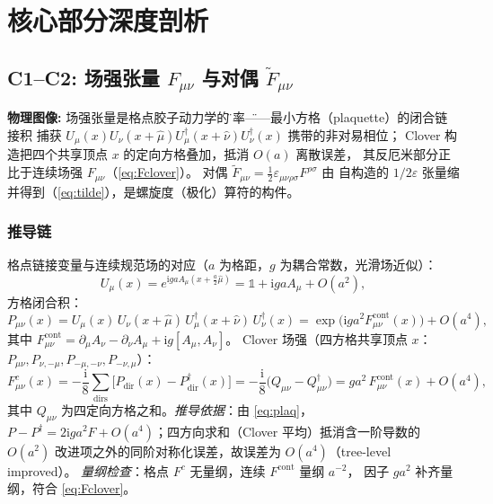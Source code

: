 \documentclass[UTF8]{ctexart}
\begin{document}
\section{核心部分深度剖析}

\subsection{C1--C2: 场强张量 $F_{\mu\nu}$ 与对偶 $\widetilde F_{\mu\nu}$}
\begin{physbox}
\textbf{物理图像:} 场强张量是格点胶子动力学的\"曲率\"——最小方格（plaquette）的闭合链接积
捕获 $U_\mu(x)U_\nu(x+\hat\mu)U^\dagger_\mu(x+\hat\nu)U^\dagger_\nu(x)$ 携带的非对易相位；
Clover 构造把四个共享顶点 $x$ 的定向方格叠加，抵消 $O(a)$ 离散误差，
其反厄米部分正比于连续场强 $F_{\mu\nu}$（\eqref{eq:Fclover}）。
对偶 $\widetilde F_{\mu\nu}=\tfrac12\varepsilon_{\mu\nu\rho\sigma}F^{\rho\sigma}$ 由
自构造的 $1/2\varepsilon$ 张量缩并得到（\eqref{eq:tilde}），是螺旋度（极化）算符的构件。
\end{physbox}

\subsubsection{推导链}
格点链接变量与连续规范场的对应（$a$ 为格距，$g$ 为耦合常数，光滑场近似）：
\begin{equation}\label{eq:link}
U_\mu(x)=e^{\mathrm i g a A_\mu(x+\tfrac a2\hat\mu)} = \mathbb 1 + \mathrm i g a A_\mu + O(a^2),
\end{equation}
方格闭合积：
\begin{equation}\label{eq:plaq}
P_{\mu\nu}(x)=U_\mu(x)\,U_\nu(x+\hat\mu)\,U^\dagger_\mu(x+\hat\nu)\,U^\dagger_\nu(x)
= \exp\!\big(\mathrm i g a^2 F^{\mathrm{cont}}_{\mu\nu}(x)\big)+O(a^4),
\end{equation}
其中 $F^{\mathrm{cont}}_{\mu\nu}=\partial_\mu A_\nu-\partial_\nu A_\mu+\mathrm i g[A_\mu,A_\nu]$。
Clover 场强（四方格共享顶点 $x$：$P_{\mu\nu},P_{\nu,-\mu},P_{-\mu,-\nu},P_{-\nu,\mu}$）：
\begin{equation}\label{eq:Fclover}
F^{c}_{\mu\nu}(x)
=-\frac{\mathrm i}{8}\sum_{\mathrm{dirs}}\big[P_{\mathrm{dir}}(x)-P^\dagger_{\mathrm{dir}}(x)\big]
=-\frac{\mathrm i}{8}\big(Q_{\mu\nu}-Q^\dagger_{\mu\nu}\big)
= g a^2\,F^{\mathrm{cont}}_{\mu\nu}(x)+O(a^4),
\end{equation}
其中 $Q_{\mu\nu}$ 为四定向方格之和。\emph{推导依据}：由 \eqref{eq:plaq}，
$P-P^\dagger=2\mathrm i g a^2 F+O(a^4)$；四方向求和（Clover 平均）抵消含一阶导数的
$O(a^2)$ 改进项之外的同阶对称化误差，故误差为 $O(a^4)$（tree-level improved）。
\emph{量纲检查}：格点 $F^{c}$ 无量纲，连续 $F^{\mathrm{cont}}$ 量纲 $a^{-2}$，
因子 $g a^2$ 补齐量纲，符合 \eqref{eq:Fclover}。
\end{document}
